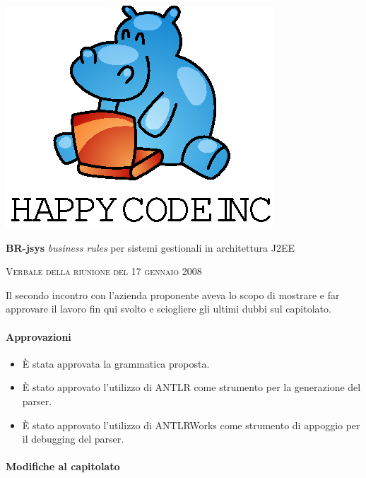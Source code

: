 \documentclass[11pt,titlepage,a4paper]{report}
\begin{document}
\begin{titlepage}
\begin{center}
\vspace*{0.5in}
\includegraphics{logo.eps}
\vspace*{0.2in}

{\Large \textbf{BR-jsys}}
{\Large \emph{business rules} per sistemi gestionali in architettura J2EE } 
\vspace{2in}

\Huge \textsc{ Verbale della riunione del 17 gennaio 2008 }

\end{center}
\end{titlepage}
\vspace*{0.5in}

\thispagestyle{plain}
Il secondo incontro con l'azienda proponente aveva lo scopo di mostrare e far approvare il lavoro fin qui svolto e sciogliere gli ultimi dubbi sul capitolato.

\paragraph{Approvazioni}
\begin{itemize}

\item \`E stata approvata la grammatica proposta.
\item \`E stato approvato l'utilizzo di ANTLR come strumento per la generazione del parser.
\item \`E stato approvato l'utilizzo di ANTLRWorks come strumento di appoggio per il debugging del parser.

\end{itemize}

\paragraph{Modifiche al capitolato}
\end{document}

